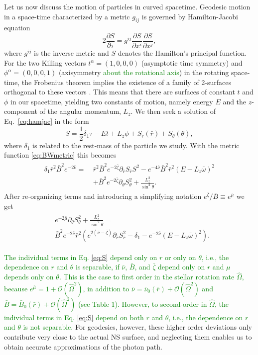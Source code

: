 \documentclass{aa}
\newcommand{\be}{\begin{equation}}
\newcommand{\ee}{\end{equation}}
\newcommand{\refe}[1]{\textcolor{green}{{#1}}}
\newcommand{\pd}{\ensuremath{\partial}} %
\newcommand{\rb}{\ensuremath{\bar{r}}}
\newcommand{\wb}{\ensuremath{\bar{\omega}}}
\newcommand{\Ob}{\ensuremath{\hat{\Omega}}}
\newcommand{\nub}{\ensuremath{\bar{\nu}}}
\newcommand{\zetab}{\ensuremath{\bar{\zeta}}}
\newcommand{\Bb}{\ensuremath{\bar{B}}}
\newcommand{\mub}{\ensuremath{\bar{\mu}}}
\begin{document}
Let us now discuss the motion of particles in curved spacetime.
Geodesic motion in a space-time characterized by a metric $g_{ij}$ is governed by Hamilton-Jacobi equation
\be\label{eq:hamjac}
2\frac{\pd S}{\pd \tau} = g^{ij} \frac{\pd S}{\pd x^i}\frac{\pd S}{\pd x^j},
\ee
where $g^{ij}$ is the inverse metric and $S$ denotes the Hamilton's principal function.
For the two Killing vectors $t^{\alpha} = (1,0,0,0)$ (asymptotic time symmetry) and $\phi^{\alpha} = (0,0,0,1)$ (axisymmetry \refe{about the rotational axis}) in the rotating space-time, the Frobenius theorem implies the existence of a family of 2-surfaces orthogonal to these vectors \citep[see e.g.,][p.12]{rcs}.  
This means that there are surfaces of constant $t$ and $\phi$ in our spacetime, yielding two constants of motion, namely energy $E$ and the $z$-component of the angular momentum, $L_z$.  
We then seek a solution of Eq.~\eqref{eq:hamjac} in the form
\be
S = \frac{1}{2}\delta_1 \tau - Et + L_z\phi + S_{\rb}(\rb) + S_{\theta}(\theta),
\ee
where $\delta_1$ is related to the rest-mass of the particle we study.
With the metric function \eqref{eq:BWmetric} this becomes
\begin{align}\begin{split} 
    \delta_1 \rb^2 \Bb^2 e^{-2\nub} =~& \rb^2 \Bb^2 e^{-2\zetab} \pd_{\rb}S_{\rb}S^2 - e^{-4\nub} \Bb^2 \rb^2 (E - L_z \wb)^2 \\
                                & + \Bb^2 e^{-2\zetab} \pd_{\theta}S_{\theta}^2 + \frac{L_z^2}{\sin^2\theta}.
\end{split}\end{align}
After re-organizing terms and introducing a simplifying notation $e^{\zetab}/\Bb \equiv e^{\mub}$ we get
\begin{align}\begin{split}\label{eq:S}
& e^{-2\mub}\pd_{\theta}S_{\theta}^2 + \frac{L_z^2}{\sin^2\theta} = \\ 
& \Bb^2 e^{-2\nub}\rb^2 ( e^{2(\nub-\zetab)} \pd_{\rb}S_{\rb}^2 -\delta_{1} - e^{-2\nub}(E - L_z \wb)^2 ).
\end{split}\end{align}

\refe{The individual terms in Eq. \eqref{eq:S} depend only on $r$ or only on $\theta$, i.e., the dependence on $r$ and $\theta$ is separable, if $\nub$, $\Bb$, and $\zetab$ depend only on $r$ and $\mu$ depends only on $\theta$. 
This is the case to first order in the stellar rotation rate $\Ob$, because $e^{\mub} = 1 + \mathcal{O}(\Ob^2)$, in addition to $\nub = \nub_0(\rb) + \mathcal{O}(\Ob^2)$ and $\Bb = \Bb_0(\rb) + \mathcal{O}(\Ob^2)$ (see Table 1). 
However, to second-order in $\Ob$, the individual terms in Eq. \eqref{eq:S} depend on both $r$ and $\theta$, i.e., the dependence on $r$ and $\theta$ is not separable.}
For geodesics, however, these higher order deviations only contribute very close to the actual NS surface, and neglecting them enables us to obtain accurate approximations of the photon path.
\end{document}
